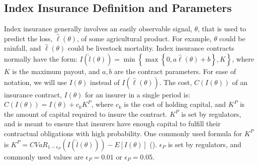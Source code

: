 \documentclass[11pt]{article}
\begin{document}
  \subsection{Index Insurance Definition and Parameters}
    Index insurance generally involves an easily observable signal, $\theta$, that is used to predict the loss, $\hat{\ell}(\theta)$, of some agricultural product. For example, $\theta$ could be rainfall, and $\hat{\ell}(\theta)$ could be livestock mortality. Index insurance contracts normally have the form: $I(\hat{l}(\theta)) = \min \left \{\max \left \{0,a\hat{\ell}(\theta) + b \right \}, K \right \}$, where $K$ is the maximum payout, and $a,b$ are the contract parameters. For ease of notation, we will use $I(\theta)$ instead of $I(\hat{\ell}(\theta))$. The cost, $C(I(\theta))$ of an insurance contract, $I(\theta)$ for an insurer in a single period is: $C(I(\theta)) = I(\theta) + c_k K^P$, where $c_k$ is the cost of holding capital, and $K^P$ is the amount of capital required to insure the contract. $K^P$ is set by regulators, and is meant to ensure that insurers have enough capital to fulfill their contractual obligations with high probability. One commonly used formula for $K^P$ is $K^P = CVaR_{1-\epsilon_P}\left ( I(\hat{l}(\theta)) \right ) - E[I(\theta)]$ (\cite{mapfumo2017risk}). $\epsilon_P$ is set by regulators, and commonly used values are $\epsilon_P = 0.01$ or $\epsilon_P = 0.05$. 

\end{document}
